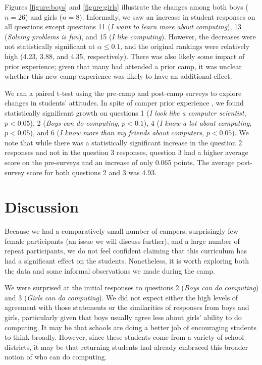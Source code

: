 Figures \ref{figure:boys} and \ref{figure:girls} illustrate the changes
among both boys ($n=26$) and girls ($n=8$).
Informally, we saw an increase in student responses on all questions
except questions 11 (\textit{I want to learn more about computing}), 
13 (\textit{Solving problems is fun}), and 15 (\textit{I like computing}).
However, the decreases were not statistically significant at $\alpha\le 0.1$,
and the original rankings were relatively high (4.23, 3.88, and 4.35,
respectively).  There was also likely some impact of prior experience;
given that many had attended a prior camp, it was unclear whether this
new camp experience was likely to have an additional effect.

We ran a paired t-test using the pre-camp and post-camp surveys to
explore changes in students' attitudes.  In spite of camper prior
experience , we found statistically significant growth on questions
1 (\textit{I look like a computer scientist}, $p < 0.05$), 2
(\textit{Boys can do computing}, $p < 0.1$), 4 (\textit{I know a
lot about computing}, $p < 0.05$), and 6 (\textit{I know more than
my friends about computers}, $p < 0.05$).  We note that while there
was a statistically significant increase in the question 2 responses
and not in the question 3 responses, question 3 had a higher average
score on the pre-surveys and an increase of only 0.065 points.
The average post-survey score for both questions 2 and 3 was 4.93.


\section{Discussion}

Because we had a comparatively small number of campers, surprisingly
few female participants (an issue we will discuss further), and a
large number of repeat participants, we do not feel confident
claiming that this curriculum has had a significant effect on the
students.  Nonetheless, it is worth exploring both the data and
some informal observations we made during the camp.

We were surprised at the initial responses to questions 2 (\textit{Boys
can do computing}) and 3 (\textit{Girls can do computing}).  We did
not expect either the high levels of agreement with those statements
or the similarities of responses from boys and girls, particularly
given that boys usually agree less about girls' ability to do
computing.  It may be that schools are doing a better job of
encouraging students to think broadly.  However, since these students
come from a variety of school districts, it may be that returning
students had already embraced this broader notion of who can do
computing.

